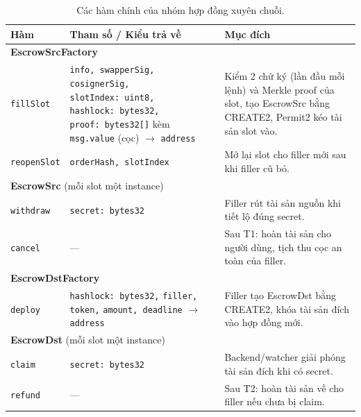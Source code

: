 \documentclass[../DoAn.tex]{subfiles}
\begin{document}
\begin{table}[H]
    \centering
    \caption{Các hàm chính của nhóm hợp đồng xuyên chuỗi.}
    \label{table:cc_methods}
    \begin{tabular}{|p{3.4cm}|p{4.9cm}|p{5.2cm}|}
        \hline
        \textbf{Hàm} & \textbf{Tham số / Kiểu trả về} & \textbf{Mục đích} \\
        \hline
        \multicolumn{3}{|l|}{\textbf{EscrowSrcFactory}} \\
        \hline
        \texttt{fillSlot} &
            \texttt{info, swapperSig,} \newline \texttt{cosignerSig,} \newline \texttt{slotIndex:~uint8,} \newline \texttt{hashlock:~bytes32,} \newline \texttt{proof:~bytes32[]} \newline kèm \texttt{msg.value} (cọc) \newline $\rightarrow$ \texttt{address} &
            Kiểm 2 chữ ký (lần đầu mỗi lệnh) và Merkle proof của slot, tạo EscrowSrc bằng CREATE2, Permit2 kéo tài sản slot vào. \\
        \hline
        \texttt{reopenSlot} &
            \texttt{orderHash, slotIndex} &
            Mở lại slot cho filler mới sau khi filler cũ bỏ. \\
        \hline
        \multicolumn{3}{|l|}{\textbf{EscrowSrc} (mỗi slot một instance)} \\
        \hline
        \texttt{withdraw} &
            \texttt{secret: bytes32} &
            Filler rút tài sản nguồn khi tiết lộ đúng secret. \\
        \hline
        \texttt{cancel} &
            --- &
            Sau T1: hoàn tài sản cho người dùng, tịch thu cọc an toàn của filler. \\
        \hline
        \multicolumn{3}{|l|}{\textbf{EscrowDstFactory}} \\
        \hline
        \texttt{deploy} &
            \texttt{hashlock:~bytes32,} \newline \texttt{filler, token,} \newline \texttt{amount, deadline} \newline $\rightarrow$ \texttt{address} &
            Filler tạo EscrowDst bằng CREATE2, khóa tài sản đích vào hợp đồng mới. \\
        \hline
        \multicolumn{3}{|l|}{\textbf{EscrowDst} (mỗi slot một instance)} \\
        \hline
        \texttt{claim} &
            \texttt{secret: bytes32} &
            Backend/watcher giải phóng tài sản đích khi có secret. \\
        \hline
        \texttt{refund} &
            --- &
            Sau T2: hoàn tài sản về cho filler nếu chưa bị claim. \\
        \hline
    \end{tabular}
\end{table}
\end{document}
